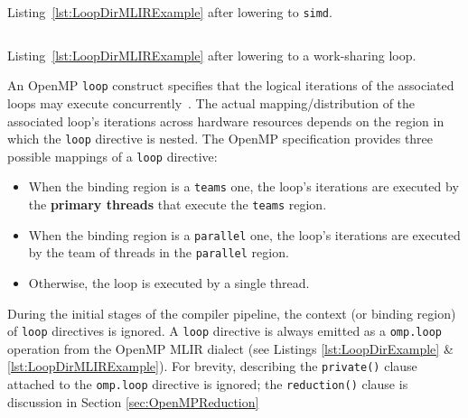 \documentclass[acmtog,natbib=false]{acmart}
\newcommand{\code}[1]{\texttt{#1}\xspace}
\begin{document}
\begin{listing}[t]
\inputminted{MLIR-lexer.py:MlirLexer -x}{code/loop_dir_simd.mlir}
\caption{Listing~\ref{lst:LoopDirMLIRExample} after lowering to \code{simd}.}
\label{lst:LoopDirSIMDExample}
\end{listing}

\begin{listing}[t]
\inputminted{MLIR-lexer.py:MlirLexer -x}{code/loop_dir_wsloop.mlir}
\caption{Listing~\ref{lst:LoopDirMLIRExample} after lowering to a work-sharing loop.}
\label{lst:LoopDirWSLoopExample}
\end{listing}

An OpenMP \code{loop} construct specifies that the logical iterations of the associated loops may execute concurrently~\cite{OARB21}.
The actual mapping/distribution of the associated loop's iterations across hardware resources depends on the region in which the \code{loop} directive is nested.
The OpenMP specification provides three possible mappings of a \code{loop} directive:
\begin{itemize}
    \item When the binding region is a \code{teams} one, the loop's iterations are executed by the \textbf{primary threads} that execute the \code{teams} region.
    \item When the binding region is a \code{parallel} one, the loop's iterations are executed by the team of threads in the \code{parallel} region.
    \item Otherwise, the loop is executed by a single thread.
\end{itemize}
During the initial stages of the compiler pipeline, the context (or binding region) of \code{loop} directives is ignored.
A \code{loop} directive is always emitted as a \code{omp.loop} operation from the OpenMP MLIR dialect (see Listings \ref{lst:LoopDirExample} \& \ref{lst:LoopDirMLIRExample}).
For brevity, describing the \code{private()} clause attached to the \code{omp.loop} directive is ignored; the \code{reduction()} clause is discussion in Section \ref{sec:OpenMPReduction}
\end{document}
